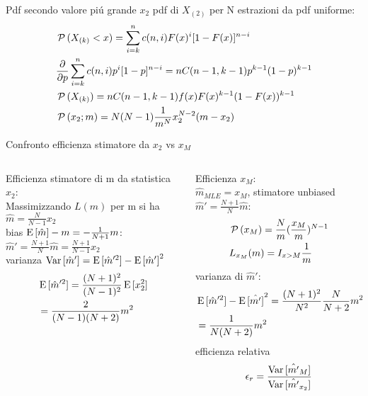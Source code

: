 \begin{frame}{Pdf secondo valore pi\'u grande $x_2$}
pdf di $X_{(2)}$ per N estrazioni da pdf uniforme:
\begin{align*}
&\operatorname{\mathcal{P}}{(X_{(k)}<x)}=\sum_{i=k}^nc(n,i)F(x)^i[1-F(x)]^{n-i}\\
&\frac{\partial}{\partial p}\sum_{i=k}^nc(n,i)p^{i}[1-p]^{n-i}=nC(n-1,k-1)p^{k-1}(1-p)^{k-1}\\
&\operatorname{\mathcal{P}}{(X_{(k)})}=nC(n-1,k-1)f(x)F(x)^{k-1}(1-F(x))^{k-1}\\
&\operatorname{\mathcal{P}}{(x_2;m)}=N(N-1)\frac{1}{m^N}x_2^{N-2}(m-x_2)
\end{align*}
\end{frame}

\begin{frame}{Confronto efficienza stimatore da $x_2$ vs $x_M$}
\begin{columns}[T]
\begin{column}{0.5\textwidth}
Efficienza stimatore di m da statistica $x_2$:\\
Massimizzando $L(m)$ per m si ha $\hat{m}=\frac{N}{N-1}x_2$\\
bias $\operatorname{E}{[\hat{m}]}-m=-\frac{1}{N+1}m$:\\ $\hat{m}'=\frac{N+1}{N}\hat{m}=\frac{N+1}{N-1}x_2$\\
varianza $\operatorname{Var}{[\hat{m}']}=\operatorname{E}{[\hat{m}'^2]}-\operatorname{E}{[\hat{m}']}^2$
\begin{align*}
&\operatorname{E}{[\hat{m}'^2]}=\frac{(N+1)^2}{(N-1)^2}\operatorname{E}{[x_2^2]}\\
&=\frac{2}{(N-1)(N+2)}m^2
\end{align*}
\end{column}
\begin{column}{0.5\textwidth}
Efficienza $x_M$:\\
$\hat{m}_{MLE}=x_M$, stimatore unbiased $\hat{m}'=\frac{N+1}{N}\hat{m}$:
\begin{align*}
&\operatorname{\mathcal{P}}{(x_M)}=\frac{N}{m}(\frac{x_M}{m})^{N-1}\\
&L_{x_M}(m)=I_{x>M}\frac{1}{m}
\end{align*}
varianza di $\hat{m}'$:
\begin{align*}
&\operatorname{E}{[\hat{m}'^2]}-\operatorname{E}{[\hat{m'}]}^2=\frac{(N+1)^2}{N^2}\frac{N}{N+2}m^2-m^2\\
&=\frac{1}{N(N+2)}m^2
\end{align*}
efficienza relativa
\begin{equation*}
\epsilon_r=\frac{\operatorname{Var}{[\hat{m'}_{M}]}}{\operatorname{Var}{[\hat{m'}_{x_2}]}}
\end{equation*}
\end{column}
\end{columns}
\end{frame}

